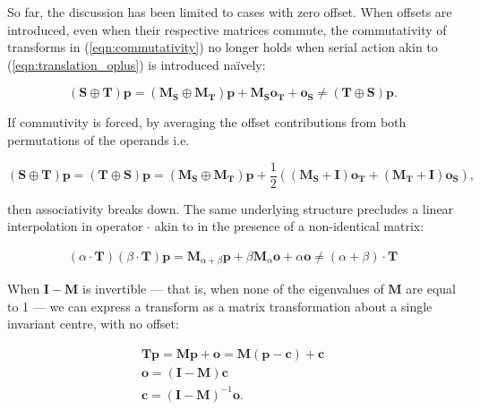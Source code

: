 		    So far, the discussion has been limited to cases with zero offset. When offsets are introduced, even when their respective matrices commute, the commutativity of transforms in (\ref{eqn:commutativity}) no longer holds when serial action akin to (\ref{eqn:translation_oplus}) is introduced na\"ively:
		    
        \begin{equation}
          (\mathbf{S} \oplus \mathbf{T})\mathbf{p} = (\mathbf{M_S} \oplus \mathbf{M_T})\mathbf{p} + \mathbf{M_So_T} + \mathbf{o_S} \ne (\mathbf{T} \oplus \mathbf{S})\mathbf{p}.
        \end{equation}
        
        If commutivity is forced, by averaging the offset contributions from both permutations of the operands i.e.
        
        \begin{equation}
          (\mathbf{S} \oplus \mathbf{T})\mathbf{p} = (\mathbf{T} \oplus \mathbf{S})\mathbf{p} = (\mathbf{M_S} \oplus \mathbf{M_T})\mathbf{p} + \frac{1}{2}\left(\left( \mathbf{M_S} + \mathbf{I} \right) \mathbf{o_T} + \left( \mathbf{M_T} + \mathbf{I} \right)\mathbf{o_S}\right),
        \end{equation}

        then associativity breaks down. The same underlying structure precludes a linear interpolation in operator $\cdot$ akin to  in the presence of a non-identical matrix:
        
        \begin{gather}
          (\alpha \cdot \mathbf{T})(\beta \cdot \mathbf{T})\mathbf{p} = \mathbf{M}_{\alpha+\beta}\mathbf{p} + \beta\mathbf{M}_{\alpha}\mathbf{o} + \alpha\mathbf{o} \ne (\alpha + \beta) \cdot \mathbf{T}
        \end{gather}
        
        When $\mathbf{I} - \mathbf{M}$ is invertible --- that is, when none of the eigenvalues of $\mathbf{M}$ are equal to 1 --- we can express a transform as a matrix transformation about a single invariant centre, with no offset:
        
        \begin{gather}
          \mathbf{Tp} = \mathbf{Mp} + \mathbf{o} = \mathbf{M}(\mathbf{p}-\mathbf{c}) + \mathbf{c} \\
          \mathbf{o} = (\mathbf{I} - \mathbf{M})\mathbf{c} \\
          \mathbf{c} = (\mathbf{I} - \mathbf{M})^{-1}\mathbf{o}.
        \end{gather}
        
